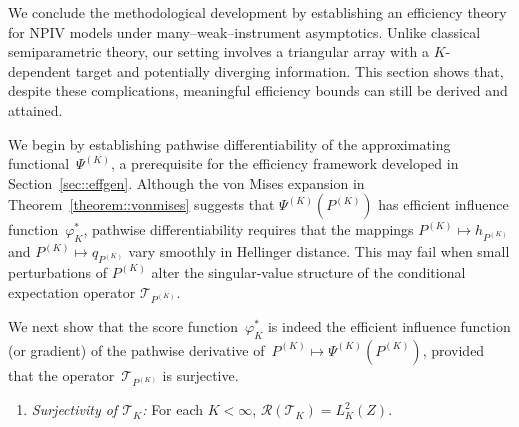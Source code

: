 \documentclass[11pt]{article}
\theoremstyle{plain}
\theoremstyle{definition}
\theoremstyle{remark}
\theoremstyle{definition}
\begin{document}
We conclude the methodological development by establishing an efficiency theory
for NPIV models under many–weak–instrument asymptotics. Unlike classical
semiparametric theory, our setting involves a triangular array with a
$K$-dependent target and potentially diverging information. This section shows
that, despite these complications, meaningful efficiency bounds can still be
derived and attained.


We begin by establishing pathwise differentiability of the approximating
functional~\(\Psi^{(K)}\), a prerequisite for the efficiency framework developed
in Section~\ref{sec::effgen}. Although the von Mises expansion in
Theorem~\ref{theorem::vonmises} suggests that \(\Psi^{(K)}(P^{(K)})\) has
efficient influence function~\(\varphi_K^*\), pathwise differentiability
requires that the mappings \(P^{(K)} \mapsto h_{P^{(K)}}\) and
\(P^{(K)} \mapsto q_{P^{(K)}}\) vary smoothly in Hellinger distance. This may
fail when small perturbations of \(P^{(K)}\) alter the singular-value structure
of the conditional expectation operator $\mathcal{T}_{P^{(K)}}$.

 


We next show that the score function~\(\varphi_K^*\) is indeed the efficient influence function (or gradient) 
of the pathwise derivative of~\(P^{(K)} \mapsto \Psi^{(K)}(P^{(K)})\), 
provided that the operator~\(\mathcal{T}_{P^{(K)}}\) is surjective.


 



\begin{enumerate}[label=\bf{C\arabic*)}, ref = C\arabic*, resume=cond]
\item \textit{Surjectivity of $\mathcal{T}_K$:} \label{cond::rightinverse}
For each \( K < \infty \),  \( \mathcal{R}(\mathcal{T}_K) = L^2_K(Z) \).
\end{enumerate}
\end{document}

